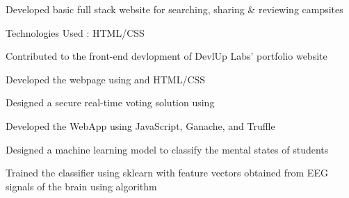 \documentclass[]{deedy-resume-openfont}
\begin{document}
\begin{minipage}[t]{0.66\textwidth}
\begin{tightemize}\item Developed basic full stack website for searching, sharing \& reviewing campsites\\
\item Technologies Used : HTML/CSS  \end{tightemize}
\sectionsep
\sectionsep

\begin{tightemize}\item Contributed to the front-end devlopment of DevlUp Labs' portfolio website\\
\item Developed the webpage using and HTML/CSS \end{tightemize}
\sectionsep
\sectionsep

\begin{tightemize}\item Designed a secure real-time voting solution using  \\
\item Developed the WebApp using JavaScript, Ganache, and Truffle\end{tightemize}
\sectionsep
\sectionsep

\begin{tightemize}\item Designed a machine learning model to classify the mental states of students \\
\item Trained the classifier using sklearn with feature vectors obtained from EEG signals of the brain using algorithm\end{tightemize}
\sectionsep
\sectionsep


\end{minipage}
\end{document}

